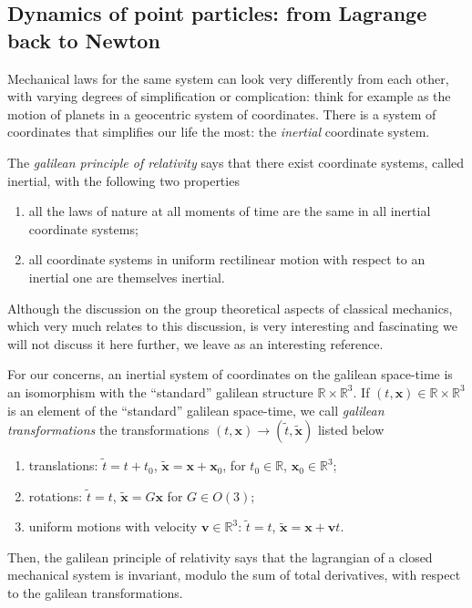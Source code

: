 \documentclass[english,fontsize=11pt,paper=a5,oneside]{scrbook}
\newcommand{\R}{\mathbb{R}}
\newcommand{\bx}{\bm{x}}
\theoremstyle{definition}
\begin{document}
\subsection{Dynamics of point particles: from Lagrange back to Newton}\label{sec:dynamicspps}

Mechanical laws for the same system can look very differently from each other, with varying degrees of simplification or complication: think for example as the motion of planets in a geocentric system of coordinates.
There is a system of coordinates that simplifies our life the most: the \emph{inertial} coordinate system.

\begin{tcolorbox}
The \emph{galilean principle of relativity} says that there exist coordinate systems, called inertial, with the following two properties
\begin{enumerate}
    \item all the laws of nature at all moments of time are the same in all inertial coordinate systems;
    \item all coordinate systems in uniform rectilinear motion with respect to an inertial one are themselves inertial.
\end{enumerate}
\end{tcolorbox}

Although the discussion on the group theoretical aspects of classical mechanics, which very much relates to this discussion, is very interesting and fascinating we will not discuss it here further, we leave \cite{book:marsdenratiu} as an interesting reference.

For our concerns, an inertial system of coordinates on the galilean space-time is an isomorphism with the ``standard'' galilean structure $\R\times\R^3$.
If $(t, \bx) \in \R\times \R^3$ is an element of the ``standard'' galilean space-time, we call \emph{galilean transformations} the transformations $(t,\bx) \to (\tilde t, \tilde{\bx})$ listed below
\begin{enumerate}
    \item translations: $\tilde t = t + t_0$, $\tilde{\bx} = \bx + \bx_0$, for $t_0\in\R$, $\bx_0\in\R^3$;
    \item rotations: $\tilde t = t$, $\tilde{\bx} = G\bx$ for $G\in O(3)$;
    \item uniform motions with velocity $\bm{v}\in\R^3$: $\tilde t = t$, $\tilde{\bx} = \bx + \bm{v} t$.
\end{enumerate}
Then, the galilean principle of relativity says that the lagrangian of a closed mechanical system is invariant, modulo the sum of total derivatives, with respect to the galilean transformations.
\end{document}
